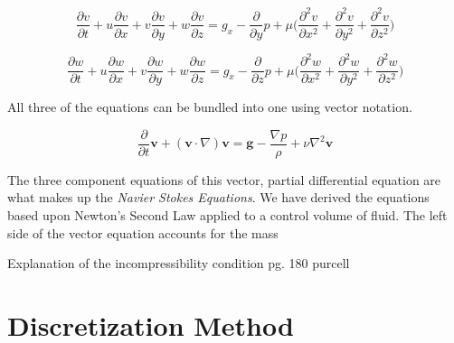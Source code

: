 \documentclass[twocolumn,12pth]{article}
\begin{document}
\begin{equation*}
\frac{\partial{v}}{\partial{t}} + u\frac{\partial{v}}{\partial{x}} + v\frac{\partial{v}}{\partial{y}} + w\frac{\partial{v}}{\partial{z}} = g_x -\frac{\partial}{\partial{y}}p + \mu \bigg( \frac{\partial^2v}{\partial{x}^2} + \frac{\partial^2v}{\partial{y}^2} + \frac{\partial^2v}{\partial{z}^2} \bigg)
\end{equation*}

\begin{equation*}
\frac{\partial{w}}{\partial{t}} + u\frac{\partial{w}}{\partial{x}} + v\frac{\partial{w}}{\partial{y}} + w\frac{\partial{w}}{\partial{z}} = g_x -\frac{\partial}{\partial{z}}p + \mu \bigg( \frac{\partial^2w}{\partial{x}^2} + \frac{\partial^2w}{\partial{y}^2} + \frac{\partial^2w}{\partial{z}^2} \bigg)
\end{equation*}

All three of the equations can be bundled into one using vector notation.

\begin{equation}
\frac{\partial}{\partial{t}} \mathbf{v} + (\mathbf{v} \cdot \nabla)\mathbf{v} = \mathbf{g} - \frac{\nabla{p}}{\rho} + \nu\nabla^2{\mathbf{v}}
\end{equation}

The three component equations of this vector, partial differential equation are what makes up the \textit{Navier Stokes Equations}.
We have derived the equations based upon Newton's Second Law applied to a control volume of fluid.
The left side of the vector equation accounts for the mass 

Explanation of the incompressibility condition pg. 180 purcell

\section{Discretization Method}
\end{document}
